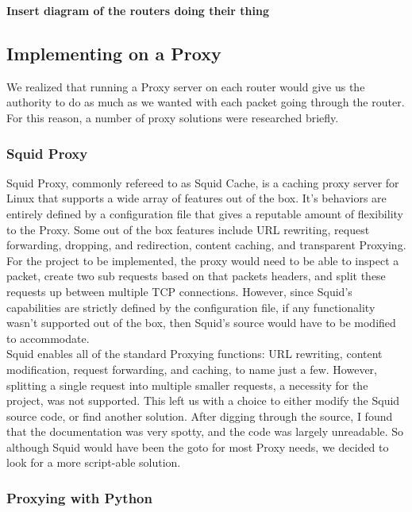 \documentclass[12pt]{article}
\newcommand{\comment}[1]
{\par {\bfseries \color{blue} #1 \par}}
\begin{document}
		\comment{Insert diagram of the routers doing their thing}





	\subsection{Implementing on a Proxy}

		We realized that running a Proxy server on each router would give us the authority to do as much as we wanted with each packet going through the router. For this reason, a number of proxy solutions were researched briefly. 

		\subsubsection{Squid Proxy}

			Squid Proxy, commonly refereed to as Squid Cache, is a caching proxy server for Linux that supports a wide array of features out of the box. It's behaviors are entirely defined by a configuration file that gives a reputable amount of flexibility to the Proxy. Some out of the box features include URL rewriting, request forwarding, dropping, and redirection, content caching, and transparent Proxying. \\

			For the project to be implemented, the proxy would need to be able to inspect a packet, create two sub requests based on that packets headers, and split these requests up between multiple TCP connections. However, since Squid's capabilities are strictly defined by the configuration file, if any functionality wasn't supported out of the box, then Squid's source would have to be modified to accommodate. \\

			Squid enables all of the standard Proxying functions: URL rewriting, content modification, request forwarding, and caching, to name just a few. However, splitting a single request into multiple smaller requests, a necessity for the project, was not supported. This left us with a choice to either modify the Squid source code, or find another solution. After digging through the source, I found that the documentation was very spotty, and the code was largely unreadable. So although Squid would have been the goto for most Proxy needs, we decided to look for a more script-able solution.

		\subsubsection{Proxying with Python}
\end{document}
